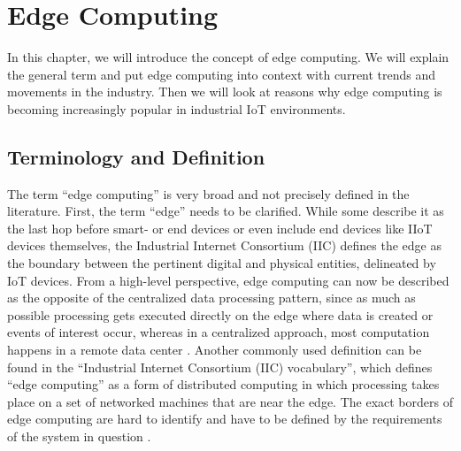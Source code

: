 \section{Edge Computing}
\label{section:edge-computing}

    In this chapter, we will introduce the concept of edge computing. We will explain the general term and put edge computing into context with current trends and movements in the industry. Then we will look at reasons why edge computing is becoming increasingly popular in industrial IoT environments.
    
    \subsection{Terminology and Definition}
        The term ``edge computing'' is very broad and not precisely defined in the literature. First, the term ``edge'' needs to be clarified. While some describe it as the last hop before smart- or end devices or even include end devices like IIoT devices themselves, the Industrial Internet Consortium (IIC) defines the edge as the boundary between the pertinent digital and physical entities, delineated by IoT devices. From a high-level perspective, edge computing can now be described as the opposite of the centralized data processing pattern, since as much as possible processing gets executed directly on the edge where data is created or events of interest occur, whereas in a centralized approach, most computation happens in a remote data center \cite{simpkins_opportunities_2022}. %
        Another commonly used definition can be found in the ``Industrial Internet Consortium (IIC) vocabulary'', which defines ``edge computing'' as a form of distributed computing in which processing takes place on a set of networked machines that are near the edge. The exact borders of edge computing are hard to identify and have to be defined by the requirements of the system in question 
        \cite{baudoin_industrial_nodate, %
        perez_edge_2022}. %

